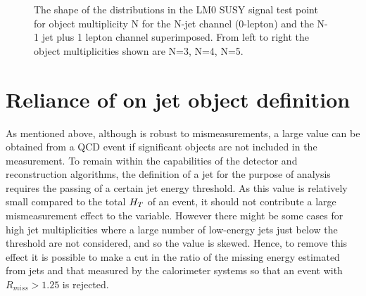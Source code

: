 \begin{figure}
\caption{\label{fig:aTnobj}The shape of the \alt distributions in the LM0 SUSY signal test point for object multiplicity N for the N-jet channel (0-lepton) and the N-1 jet plus 1 lepton channel superimposed. From left to right the object multiplicities shown are N=3, N=4, N=5.}
\end{figure}

\section{Reliance of \alt on jet object definition}

As mentioned above, although \alt is robust to mismeasurements, a large value can be obtained from a QCD event if significant objects are not included in the measurement. To remain within the capabilities of the detector and reconstruction algorithms, the definition of a jet for the purpose of analysis requires the passing of a certain jet energy threshold. As this value is relatively small compared to the total $H_{T} $ of an event, it should not contribute a large mismeasurement effect to the \alt variable. However there might be some cases for high jet multiplicities where a large number of low-energy jets just below the threshold are not considered, and so the \alt value is skewed. Hence, to remove this effect it is possible to make a cut in the ratio of the missing energy estimated from jets \mht and that measured by the calorimeter systems \met so that an event with $R_{miss} > 1.25$ is rejected. 
